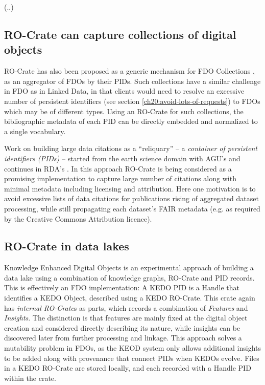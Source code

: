 (..)

\subsection{RO-Crate can capture collections of digital objects}

RO-Crate has also been proposed as a generic mechanism for FDO Collections \cite{fdo-collections}, as an aggregator of FDOs by their PIDs. Such collections have a similar challenge in FDO as in Linked Data, in that clients would need to resolve an excessive number of persistent identifiers (see section \vref{ch20:avoid-lots-of-requests}) to FDOs which may be of different types. Using an RO-Crate for such collections, the bibliographic metadata of each PID can be directly embedded and normalized to a single vocabulary. 
 
Work on building large data citations as a ``reliquary'' -- a \emph{container of persistent identifiers (PIDs)} \cite{Buck 2022} -- started from the earth science domain with AGU's  and continues in RDA's . In this approach RO-Crate is being considered as a promising implementation to capture large number of citations along with minimal metadata including licensing and attribution. Here one motivation is to avoid excessive lists of data citations for publications rising of aggregated dataset processing, while still propagating each dataset's FAIR metadata (e.g. as required by the Creative Commons Attribution licence).


\subsection{RO-Crate in data lakes}

Knowledge Enhanced Digital Objects  \cite{Luo 2022} is an experimental approach of building a data lake using a combination of knowledge graphs, RO-Crate and PID records\cite{Luo 2023}. This is effectively an FDO implementation: A KEDO PID is a Handle that identifies a KEDO Object, described using a KEDO RO-Crate. This crate again has \emph{internal RO-Crate}s as parts, which records a combination of \emph{Features} and \emph{Insights}. The distinction is that features are mainly fixed at the digital object creation and considered directly describing its nature, while insights can be discovered later from further processing and linkage. This approach solves a mutability problem in FDOs, as the KEOD system only allows additional insights to be added along with provenance that connect PIDs when KEDOs evolve. Files in a KEDO RO-Crate are stored locally, and each recorded with a Handle PID within the crate.

